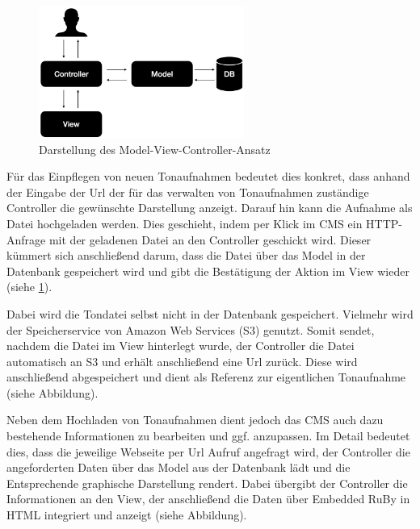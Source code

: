 \begin{figure}
	\centering
	\includegraphics[width=0.6\textwidth]{Assets/CMS_V1}
	\caption{Darstellung des Model-View-Controller-Ansatz}
	\label{fig:mvc-plurapolit}
\end{figure}

 Für das Einpflegen von neuen Tonaufnahmen bedeutet dies konkret, dass anhand der Eingabe der Url der für das verwalten von Tonaufnahmen zuständige Controller die gewünschte Darstellung anzeigt.
Darauf hin kann die Aufnahme als Datei hochgeladen werden. Dies geschieht, indem per Klick im CMS ein HTTP-Anfrage mit der geladenen Datei an den Controller geschickt wird. Dieser kümmert sich anschließend darum, dass die Datei über das Model in der Datenbank gespeichert wird und gibt die Bestätigung der Aktion im View wieder (siehe \cref{fig:mvc-plurapolit}).

Dabei wird die Tondatei selbst nicht in der Datenbank gespeichert. Vielmehr wird der Speicherservice von Amazon Web Services (S3) genutzt. Somit sendet, nachdem die Datei im View hinterlegt wurde, der Controller die Datei automatisch an S3 und erhält anschließend eine Url zurück. Diese wird anschließend abgespeichert und dient als Referenz zur eigentlichen Tonaufnahme (siehe Abbildung).

Neben dem Hochladen von Tonaufnahmen dient jedoch das CMS auch dazu bestehende Informationen zu bearbeiten und ggf. anzupassen.
Im Detail bedeutet dies, dass die jeweilige Webseite per Url Aufruf angefragt wird, der Controller die angeforderten Daten über das Model aus der Datenbank lädt und die Entsprechende graphische Darstellung rendert. Dabei übergibt der Controller die Informationen an den View, der anschließend die Daten über Embedded RuBy in HTML integriert und anzeigt (siehe Abbildung).

